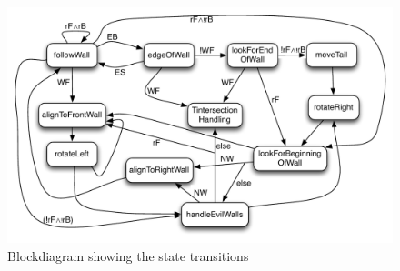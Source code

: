 \begin{figure}[h]
    \begin{centering}
   	 \includegraphics[scale=0.75]{figures/followWallStates_nice.pdf}
   	 \caption{Blockdiagram showing the state transitions}\label{fig:followWallStates}
    \end{centering}
\end{figure}

